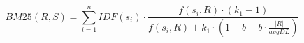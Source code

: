 \documentclass[12pt]{standalone}
\begin{document}
   \begin{varwidth}{75in}
      \begin{displaymath}
        BM25(R,S) = \sum_{i=1}^{n} IDF(s_i) \cdot \frac{f(s_i, R) \cdot (k_1 + 1)}{f(s_i, R) + k_1 \cdot (1 - b + b \cdot \frac{|R|}{avgDL})}
        \end{displaymath}
    \end{varwidth}
\end{document}
